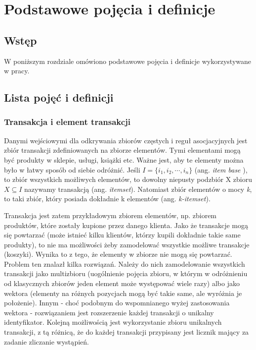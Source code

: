\chapter{Podstawowe pojęcia i definicje}
\label{c2}

\section{Wstęp}
\label{c21}

W poniższym rozdziale omówiono podstawowe pojęcia i definicje wykorzystywane w pracy. 

\section{Lista pojęć i definicji}
\label{c22}

\subsection{Transakcja i element transakcji}
\label{c221}
Danymi wejściowymi dla odkrywania zbiorów częstych i reguł asocjacyjnych jest zbiór transakcji zdefiniowanych na zbiorze elementów. Tymi elementami mogą być produkty w sklepie, usługi, książki etc. Ważne jest, aby te elementy można było w łatwy sposób od siebie odróżnić. Jeśli \( I = \{ i_1, i_2, \cdots, i_n \}\)  (ang. \textit {item base} ), to zbiór wszystkich możliwych elementów, to dowolny niepusty podzbiór X zbioru \(X\subseteq I\) nazywamy transakcją (ang. \textit{itemset}). Natomiast zbiór elementów o mocy \textit{k}, to taki zbiór, który posiada dokładnie k elementów (ang. \textit{k-itemset}). 

Transakcja jest zatem przykładowym zbiorem elementów, np. zbiorem produktów, które zostały kupione przez danego klienta. Jako że transakcje mogą się powtarzać (może istnieć kilku klientów, którzy kupili dokładnie takie same produkty), to nie ma możliwości żeby zamodelować wszystkie możliwe transakcje (koszyki). Wynika to z tego, że elementy w zbiorze nie mogą się powtarzać. Problem ten znalazł kilka rozwiązań. Należy do nich zamodelowanie wszystkich transakcji jako multizbioru (uogólnienie pojęcia zbioru, w którym w odróżnieniu od klasycznych zbiorów jeden element może występować wiele razy) albo jako wektora (elementy na różnych pozycjach mogą być takie same, ale wyróżnia je położenie). Innym - choć podobnym do wspomnianego wyżej zastosowania wektora - rozwiązaniem jest rozszerzenie każdej transakcji o unikalny identyfikator. Kolejną możliwością jest wykorzystanie zbioru unikalnych transakcji, z tą różnicą, że do każdej transakcji przypisany jest licznik mający za zadanie zliczanie wystąpień.

